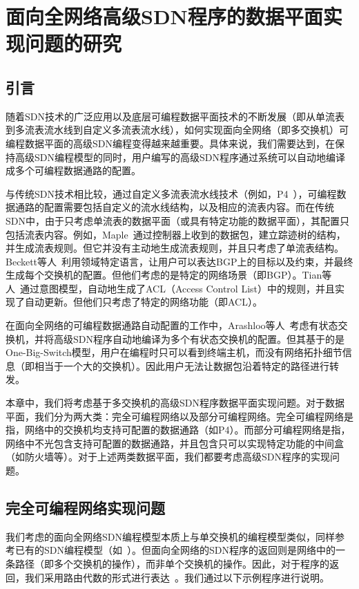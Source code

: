 \chapter{面向全网络高级SDN程序的数据平面实现问题的研究}

\section{引言}

随着SDN技术的广泛应用以及底层可编程数据平面技术的不断发展（即从单流表到多流表流水线到自定义多流表流水线），如何实现面向全网络（即多交换机）可编程数据平面的高级SDN编程变得越来越重要。具体来说，我们需要达到，在保持高级SDN编程模型的同时，用户编写的高级SDN程序通过系统可以自动地编译成多个可编程数据通路的配置。

与传统SDN技术相比较，通过自定义多流表流水线技术（例如，P4~\cite{P4}），可编程数据通路的配置需要包括自定义的流水线结构，以及相应的流表内容。而在传统SDN中，由于只考虑单流表的数据平面（或具有特定功能的数据平面），其配置只包括流表内容。例如，Maple~\cite{voellmy2013maple}通过控制器上收到的数据包，建立踪迹树的结构，并生成流表规则。但它并没有主动地生成流表规则，并且只考虑了单流表结构。Beckett等人~\cite{beckett2016don}利用领域特定语言，让用户可以表达BGP上的目标以及约束，并最终生成每个交换机的配置。但他们考虑的是特定的网络场景（即BGP）。Tian等人~\cite{tian2019safely}通过意图模型，自动地生成了ACL（Access Control List）中的规则，并且实现了自动更新。但他们只考虑了特定的网络功能（即ACL）。

在面向全网络的可编程数据通路自动配置的工作中，Arashloo等人~\cite{snap}考虑有状态交换机，并将高级SDN程序自动地编译为多个有状态交换机的配置。但其基于的是One-Big-Switch模型，用户在编程时只可以看到终端主机，而没有网络拓扑细节信息（即相当于一个大的交换机）。因此用户无法让数据包沿着特定的路径进行转发。

本章中，我们将考虑基于多交换机的高级SDN程序数据平面实现问题。对于数据平面，我们分为两大类：完全可编程网络以及部分可编程网络。完全可编程网络是指，网络中的交换机均支持可配置的数据通路（如P4）。而部分可编程网络是指，网络中不光包含支持可配置的数据通路，并且包含只可以实现特定功能的中间盒（如防火墙等）。对于上述两类数据平面，我们都要考虑高级SDN程序的实现问题。

\section{完全可编程网络实现问题}

我们考虑的面向全网络SDN编程模型本质上与单交换机的编程模型类似，同样参考已有的SDN编程模型（如~\cite{snap,sivaraman2016packet}）。但面向全网络的SDN程序的返回则是网络中的一条路径（即多个交换机的操作），而非单个交换机的操作。因此，对于程序的返回，我们采用路由代数的形式进行表达~\cite{gao2018t}。我们通过以下示例程序进行说明。


